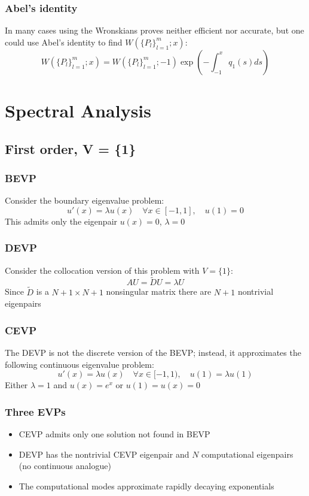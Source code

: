 \documentclass{beamer}
\begin{document}
\begin{frame}
\frametitle{Abel's identity}
In many cases using the Wronskians proves neither efficient nor accurate,
but one could use Abel's identity to find $W(\{P_l\}_{l=1}^m ; x)$:
\begin{equation*}
W(\{P_l\}_{l=1}^m ; x) = W(\{P_l\}_{l=1}^m ; -1) \exp \left ( - \int_{-1}^x q_1(s) ds \right )
\end{equation*}
\end{frame}

\section{Spectral Analysis}

\subsection{First order, V = \{1\}}

\begin{frame}
\frametitle{BEVP}
Consider the boundary eigenvalue problem:
\begin{equation*}
u'(x) = \lambda u(x) \quad \forall x \in [-1,1], \quad u(1) = 0
\end{equation*}
This admits only the eigenpair $u(x) = 0$, $\lambda =0$
\end{frame}

\begin{frame}
\frametitle{DEVP}
Consider the collocation version of this problem with $V = \{1\}$:
\begin{equation*}
A U = \tilde{D} U = \lambda U
\end{equation*}
Since $\tilde{D}$ is a $N+1 \times N+1$ nonsingular matrix there are $N+1$ nontrivial eigenpairs
\end{frame}

\begin{frame}
\frametitle{CEVP}
The DEVP is not the discrete version of the BEVP;
instead, it approximates the following continuous eigenvalue problem:
\begin{equation*}
u'(x) = \lambda u(x) \quad \forall x \in [-1,1), \quad u(1) = \lambda u(1)
\end{equation*}
Either $\lambda = 1$ and $u(x) = e^x$ or $u(1) = u(x) = 0$
\end{frame}

\begin{frame}
\frametitle{Three EVPs}
\begin{itemize}
\item CEVP admits only one solution not found in BEVP
\item DEVP has the nontrivial CEVP eigenpair and $N$ computational eigenpairs (no continuous analogue)
\item The computational modes approximate rapidly decaying exponentials
\end{itemize}
\end{frame}
\end{document}
